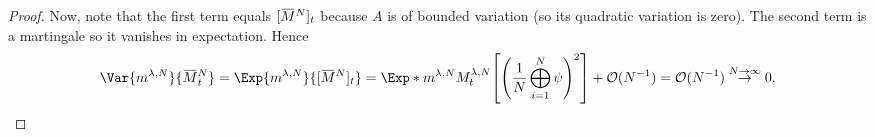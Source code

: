 \begin{proof}
  Now, note that the first term equals \(\sbr{\ol{M}^N}_t\) because \(A\) is of bounded variation (so its quadratic variation is zero).
  The second term is a martingale so it vanishes in expectation.    %
  Hence
  \begin{equation}
    \Var{\lawmu^{\lambda,N}}{\ol{M}_t^N}
    = \Exp{\lawmu^{\lambda,N}}{\sbr{\ol{M}^N}_t}
    = \Exp*{\lawmu^{\lambda,N}}{M_t^{\lambda, N}\sbr*{ \br*{ \frac{1}{N} \bigoplus_{i=1}^N \psi }^2 }} + \mathcal{O}(N^{-1})
    = \mathcal{O}(N^{-1}) \overset{N\to\infty}{\to} 0.
  \end{equation}
\end{proof}